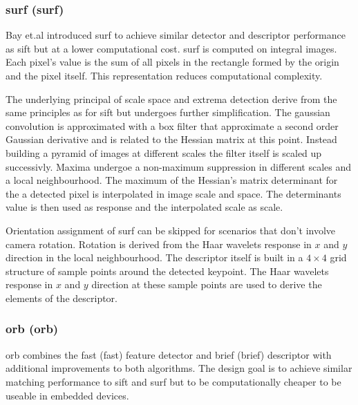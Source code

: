 \subsubsection{\acrshort{surf} (\acrlong{surf})}

Bay et.al introduced \acrshort{surf}\cite{bay_eccv06} to achieve similar detector and descriptor performance as \acrshort{sift} but at a lower computational cost.
\acrshort{surf} is computed on integral images\cite{viola_cvpr01}.
Each pixel's value is the sum of all pixels in the rectangle formed by the origin and the pixel itself.
This representation reduces computational complexity.

The underlying principal of scale space and extrema detection derive from the same principles as for \acrshort{sift} but undergoes further simplification.
The gaussian convolution is approximated with a box filter that approximate a second order Gaussian derivative and is related to the Hessian matrix at this point.
Instead building a pyramid of images at different scales the filter itself is scaled up successivly.
Maxima undergoe a non-maximum suppression in different scales and a local neighbourhood.
The maximum of the Hessian's matrix determinant for the a detected pixel is interpolated in image scale and space.
The determinants value is then used as response and the interpolated scale as scale.

Orientation assignment of \acrshort{surf} can be skipped for scenarios that don't involve camera rotation.
Rotation is derived from the Haar wavelets response in $x$ and $y$ direction in the local neighbourhood.
The descriptor itself is built in a $4\times4$ grid structure of sample points around the detected keypoint.
The Haar wavelets response in $x$ and $y$ direction at these sample points are used to derive the elements of the descriptor.

\subsubsection{\acrshort{orb} (\acrlong{orb})}

\acrshort{orb}\cite{rublee_iccv11} combines the \acrshort{fast}\cite{rosten_eccv06} (\acrlong{fast}) feature detector and \acrshort{brief}\cite{calonder_eccv10} (\acrlong{brief}) descriptor with additional improvements to both algorithms.
The design goal is to achieve similar matching performance to \acrshort{sift} and \acrshort{surf} but to be computationally cheaper to be useable in embedded devices.

